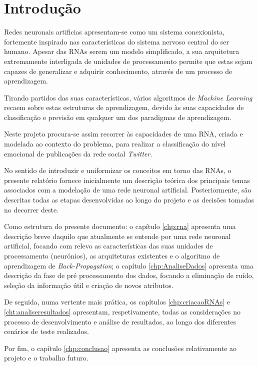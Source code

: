 \chapter{Introdução}

Redes neuronais artificias apresentam-se como um sistema conexionista, fortemente inspirado nas características do sistema nervoso central do ser humano. 
Apesar das RNAs serem um modelo simplificado, a sua arquitetura extremamente interligada de unidades de processamento permite que estas sejam capazes de generalizar e adquirir conhecimento, através de um processo de aprendizagem. 

Tirando partidos das suas características, vários algoritmos de \textit{Machine Learning} recaem sobre estas estruturas de aprendizagem, devido às suas capacidades de classificação e previsão em qualquer um dos paradigmas de aprendizagem. 

Neste projeto procura-se assim recorrer às capacidades de uma RNA, criada e modelada ao contexto do problema, para realizar a classificação do nível emocional de publicações da rede social \textit{Twitter}. 

No sentido de introduzir e uniformizar os conceitos em torno das RNAs, o presente relatório fornece inicialmente um descrição teórica dos principais temas associados com a modelação de uma rede neuronal artificial. 
Posteriormente, são descritas todas as etapas desenvolvidas ao longo do projeto e as decisões tomadas no decorrer deste.

Como estrutura do presente documento: o capítulo \ref{chp:rna} apresenta uma descrição breve daquilo que atualmente se entende por uma rede neuronal artificial, focando com relevo as características das suas unidades de processamento (neurónios), as arquiteturas existentes e o algoritmo de aprendizagem de \textit{Back-Propagation}; o capítulo \ref{chp:AnaliseDados} apresenta uma descrição da fase de pré processamento dos dados, focando a eliminação de ruído, seleção da informação útil e criação de novos atributos.

De seguida, numa vertente mais prática, os capítulos \ref{chp:criacaoRNAs} e \ref{cht:analiseresultados} apresentam, respetivamente, todas as considerações no processo de desenvolvimento e análise de resultados, ao longo dos diferentes cenários de teste realizados. 

Por fim, o capítulo \ref{chp:conclusao} apresenta as conclusões relativamente ao projeto e o trabalho futuro. 

\vspace{5cm}



